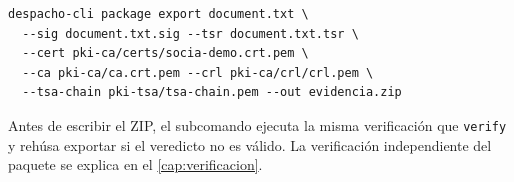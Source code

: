 \begin{verbatim}
despacho-cli package export document.txt \
  --sig document.txt.sig --tsr document.txt.tsr \
  --cert pki-ca/certs/socia-demo.crt.pem \
  --ca pki-ca/ca.crt.pem --crl pki-ca/crl/crl.pem \
  --tsa-chain pki-tsa/tsa-chain.pem --out evidencia.zip
\end{verbatim}

Antes de escribir el ZIP, el subcomando ejecuta la misma verificación que
\texttt{verify} y rehúsa exportar si el veredicto no es válido. La
verificación independiente del paquete se explica en el
\cref{cap:verificacion}.

